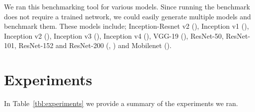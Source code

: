 We ran this benchmarking tool for various models. Since running the benchmark does not require a trained network, we could easily generate multiple models and benchmark them. These models include; Inception-Resnet v2 (\cite{DBLP:journals/corr/SzegedyIV16}), Inception v1 (\cite{Szegedy:2014aa}), Inception v2 (\cite{Szegedy:2014aa}), Inception v3 (\cite{Szegedy_2016_CVPR}), Inception v4 (\cite{DBLP:journals/corr/SzegedyIV16}), VGG-19 (\cite{Simonyan:2014aa}), ResNet-50, ResNet-101, ResNet-152 and ResNet-200 (\cite{He:2015aa}, \cite{he2016identity}) and Mobilenet (\cite{howard2017mobilenets}).  
\fi

\newpage
\section{Experiments}
In Table~\ref{tbl:experiments} we provide a summary of the experiments we ran.
